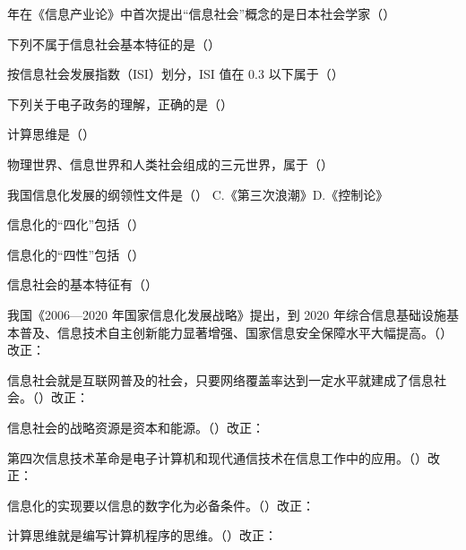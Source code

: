 \documentclass[a4paper,11pt]{article}
\begin{document}
 年在《信息产业论》中首次提出“信息社会”概念的是日本社会学家（\quad）

\q 下列不属于信息社会基本特征的是（\quad）

\q 按信息社会发展指数（ISI）划分，ISI 值在 0.3 以下属于（\quad）

\q 下列关于电子政务的理解，正确的是（\quad）

\q 计算思维是（\quad）

\q 物理世界、信息世界和人类社会组成的三元世界，属于（\quad）

\q 我国信息化发展的纲领性文件是（\quad）
{C.《第三次浪潮》}{D.《控制论》}

\q 信息化的“四化”包括（\quad）

\q 信息化的“四性”包括（\quad）

\q 信息社会的基本特征有（\quad）

\q 我国《2006—2020 年国家信息化发展战略》提出，到 2020 年综合信息基础设施基本普及、信息技术自主创新能力显著增强、国家信息安全保障水平大幅提高。\quad（\quad）\quad 改正：\fixblank

\q 信息社会就是互联网普及的社会，只要网络覆盖率达到一定水平就建成了信息社会。\quad（\quad）\quad 改正：\fixblank

\q 信息社会的战略资源是资本和能源。\quad（\quad）\quad 改正：\fixblank

\q 第四次信息技术革命是电子计算机和现代通信技术在信息工作中的应用。\quad（\quad）\quad 改正：\fixblank

\q 信息化的实现要以信息的数字化为必备条件。\quad（\quad）\quad 改正：\fixblank

\q 计算思维就是编写计算机程序的思维。\quad（\quad）\quad 改正：\fixblank
\end{document}
